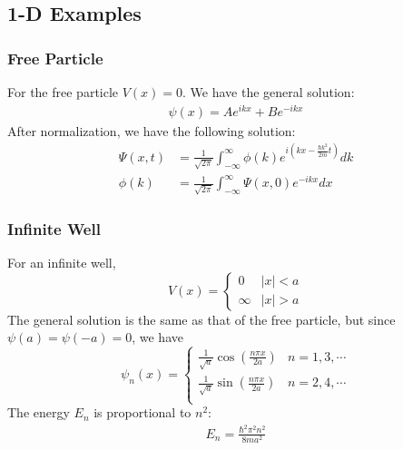 \documentclass[11pt, letterpaper]{article}
\begin{document}
\begin{multicols*}{3}
\subsection{1-D Examples}
\subsubsection{Free Particle}
For the free particle $V(x) = 0$. We have the general solution:
\begin{align*}
  \psi (x) = Ae^{ikx} + Be^{-ikx}
\end{align*}
After normalization, we have the following solution:
\begin{align*}
  \Psi (x,t) &= \frac{1}{\sqrt{2\pi}} \int_{-\infty}^\infty \phi(k)
  e^{i \left( kx-\frac{\hbar k^2}{2m}t \right)} dk \\
  \phi(k) &= \frac{1}{\sqrt{2\pi}} \int_{-\infty}^\infty \Psi(x, 0) e^{-ikx} dx
\end{align*}
\subsubsection{Infinite Well}
For an infinite well,
\[
  V(x) =
  \begin{cases}
    0 &  |x| < a \\
    \infty & |x| > a
  \end{cases}
\]
The general solution is the same as that of the free particle, but since
$\psi(a) = \psi(-a) = 0$, we have
\[
  \psi_n(x) =
  \begin{cases}
    \frac{1}{\sqrt{a}}\cos \left(\frac{n\pi x}{2a}\right) & n = 1,3,\cdots \\
    \frac{1}{\sqrt{a}}\sin \left(\frac{n\pi x}{2a}\right) & n = 2,4,\cdots \\
  \end{cases}
\]
The energy $E_n$ is proportional to $n^2$:
\begin{align*}
  E_n = \frac{\hbar^2 \pi^2 n^2}{8 m a^2}
\end{align*}


\end{multicols*}
\end{document}
